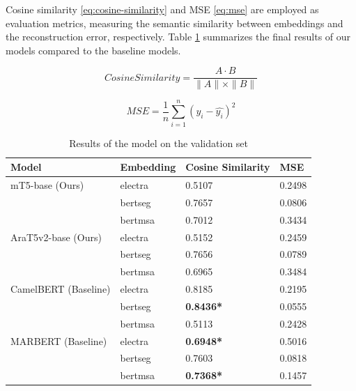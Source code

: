 \documentclass[12.5pt]{article}
\begin{document}
Cosine similarity \ref{eq:cosine-similarity} and MSE \ref{eq:mse} are employed as evaluation metrics, measuring the semantic similarity between embeddings and the reconstruction error, respectively. Table \ref{table:results} summarizes the final results of our models compared to the baseline models.

\begin{equation}\label{eq:cosine-similarity}
    Cosine Similarity = \frac{A \cdot B}{\|A\| \times \|B\|}
\end{equation}

\begin{equation}\label{eq:mse}
    MSE = \frac{1}{n} \sum_{i=1}^{n} (y_i - \hat{y_i})^2
\end{equation}

\begin{table}[H]
    \centering
    \caption{Results of the model on the validation set}
    \label{table:results}
    \renewcommand{\arraystretch}{1.5}%
    \begin{tabularx}{\textwidth}{|>{\raggedright}X|>{\raggedright\arraybackslash}X|X|X|}
        \hline
        \textbf{Model} & \textbf{Embedding} & \textbf{Cosine Similarity} & \textbf{MSE} \\
        \hline
        mT5-base (Ours) & electra & 0.5107 & 0.2498 \\\cline{2-4}
        & bertseg & 0.7657 & 0.0806 \\\cline{2-4}
        & bertmsa & 0.7012 & 0.3434 \\\cline{2-4}
        \hline
        AraT5v2-base (Ours) & electra & 0.5152 & 0.2459 \\\cline{2-4}
        & bertseg & 0.7656 & 0.0789 \\\cline{2-4}
        & bertmsa & 0.6965 & 0.3484 \\\cline{2-4}
        \hline
        CamelBERT (Baseline) & electra & 0.8185 & 0.2195 \\\cline{2-4}
        & bertseg & \textbf{0.8436*} & 0.0555 \\\cline{2-4}
        & bertmsa & 0.5113 & 0.2428 \\\cline{2-4}
        \hline
        MARBERT (Baseline) & electra & \textbf{0.6948*} & 0.5016 \\\cline{2-4}
        & bertseg & 0.7603 & 0.0818 \\\cline{2-4}
        & bertmsa & \textbf{0.7368*} & 0.1457 \\\cline{2-4}
        \hline
    \end{tabularx}
\end{table}
\end{document}
